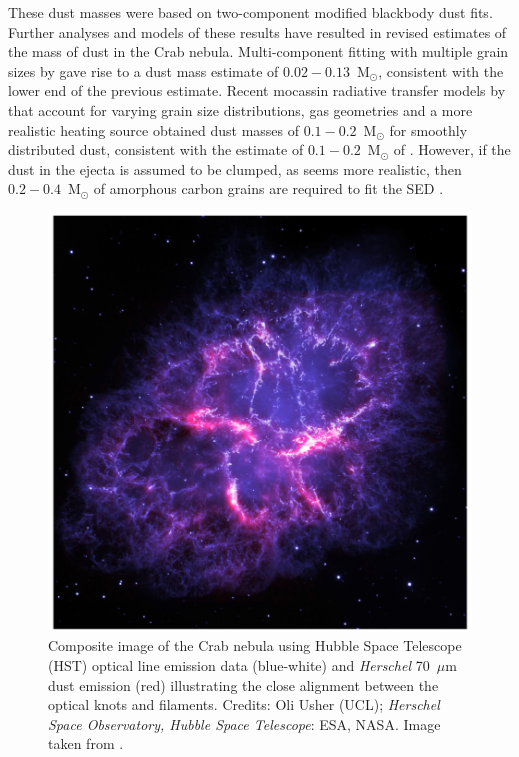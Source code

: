  These dust masses were based on  two-component modified blackbody dust fits.  Further analyses and models of these results have resulted in revised estimates of the mass of dust in the Crab nebula.  Multi-component fitting with multiple grain sizes by \citet{Temim2013} gave rise to a dust mass estimate of $0.02-0.13$~M$_{\odot}$, consistent with the lower end of the previous estimate.  Recent {\sc mocassin} radiative transfer models by \citet{Owen2015} that account for varying grain size distributions, gas geometries and a more realistic heating source obtained dust masses of $0.1-0.2$~M$_{\odot}$ for smoothly distributed dust, consistent with the estimate of $0.1-0.2$~M$_{\odot}$ of \citet{Gomez2012}.  However, if the dust in the ejecta is assumed to be clumped, as seems more realistic, then $0.2 - 0.4$~M$_{\odot}$ of amorphous carbon grains are required to fit the SED \citep{Owen2015}. 
 
 \begin{figure}
\centering
\includegraphics[clip=true,scale=0.3,trim= 0 0 0 0]{chapters/chapter1/figs/Crab.png}
\caption{Composite image of the Crab nebula using Hubble Space Telescope (HST) optical line emission data (blue-white) and {\em Herschel} 70~$\mu$m dust emission (red) illustrating the close alignment between the optical knots and filaments.  Credits: Oli Usher (UCL); \textit{Herschel Space Observatory, Hubble Space Telescope}: ESA, NASA.  Image taken from \citet{Owen2015}.}
\label{fig:Crab}
\end{figure}
 

